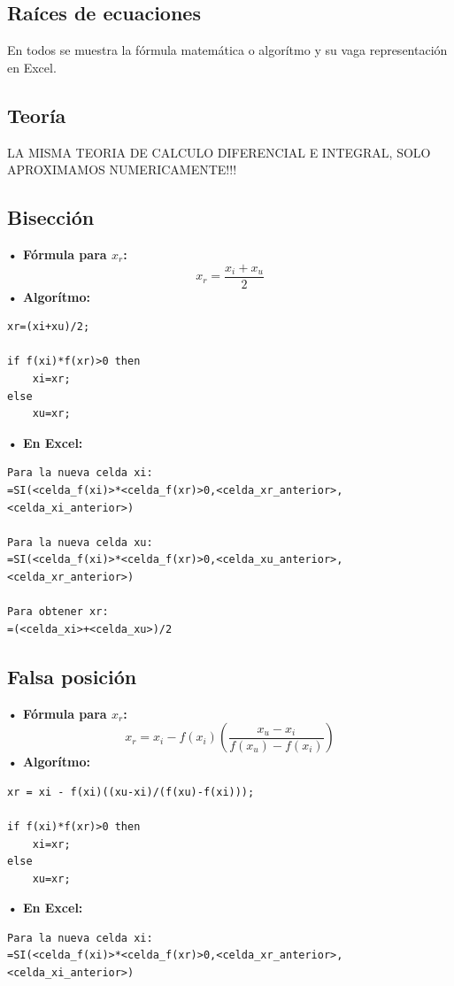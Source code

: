 \documentclass[letterpaper, 12pt]{article}
\begin{document}
    \newpage
    \begin{justify}
        \setcounter{page}{1}
        \thispagestyle{fancy}
        \section{Raíces de ecuaciones}
        \justify
        En todos se muestra la fórmula matemática o algorítmo y su vaga representación en Excel.
        \subsection*{Teoría}
        \justify
        LA MISMA TEORIA DE CALCULO DIFERENCIAL E INTEGRAL, SOLO APROXIMAMOS NUMERICAMENTE!!!
        \subsection*{Bisección}
        \justify
        \textbf{• Fórmula para \(x_r\):}
        {\large \[x_r=\frac{x_i+x_u}{2}\]}
        \justify
        \textbf{• Algorítmo:}
{\large\begin{verbatim}
xr=(xi+xu)/2;

if f(xi)*f(xr)>0 then
    xi=xr;
else
    xu=xr;
\end{verbatim}}
        \justify
        \textbf{• En Excel:}
{\large\begin{verbatim}
Para la nueva celda xi: 
=SI(<celda_f(xi)>*<celda_f(xr)>0,<celda_xr_anterior>,
<celda_xi_anterior>)

Para la nueva celda xu:
=SI(<celda_f(xi)>*<celda_f(xr)>0,<celda_xu_anterior>,
<celda_xr_anterior>)

Para obtener xr:
=(<celda_xi>+<celda_xu>)/2
\end{verbatim}}
        \subsection*{Falsa posición}
        \justify
        \textbf{• Fórmula para \(x_r\):}
        {\large \[x_r=x_i-f(x_i)\left(\frac{x_u-x_i}{f(x_u)-f(x_i)}\right)\]}
        \justify
        \textbf{• Algorítmo:}
{\large \begin{verbatim}
xr = xi - f(xi)((xu-xi)/(f(xu)-f(xi)));

if f(xi)*f(xr)>0 then
    xi=xr;
else
    xu=xr;
\end{verbatim}}
        \justify
        \textbf{• En Excel:}
{\large\begin{verbatim}
Para la nueva celda xi: 
=SI(<celda_f(xi)>*<celda_f(xr)>0,<celda_xr_anterior>,
<celda_xi_anterior>)
    

\end{verbatim}}
\end{justify}
\end{document}
